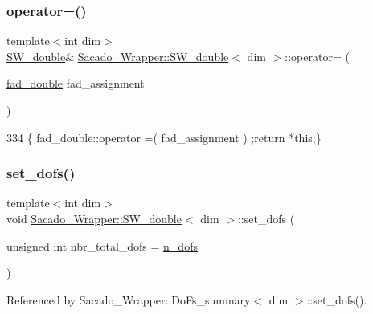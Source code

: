 \subsubsection{\texorpdfstring{operator=()}{operator=()}\hspace{0.1cm}{\footnotesize\ttfamily [2/2]}}
{\footnotesize\ttfamily template$<$int dim$>$ \\
\hyperlink{classSacado__Wrapper_1_1SW__double}{S\+W\+\_\+double}\& \hyperlink{classSacado__Wrapper_1_1SW__double}{Sacado\+\_\+\+Wrapper\+::\+S\+W\+\_\+double}$<$ dim $>$\+::operator= (\begin{DoxyParamCaption}\item[{\hyperlink{Sacado__example_8cc_a868b94676739e612d9c95940e70892a9}{fad\+\_\+double}}]{fad\+\_\+assignment }\end{DoxyParamCaption})\hspace{0.3cm}{\ttfamily [inline]}}


\begin{DoxyCode}
334 \{ fad\_double::operator =( fad\_assignment ) ;\textcolor{keywordflow}{return} *\textcolor{keyword}{this};\}
\end{DoxyCode}
\mbox{\label{classSacado__Wrapper_1_1SW__double_a36ced4218d40104fd8e548039a97cfb8}} 
\subsubsection{\texorpdfstring{set\+\_\+dofs()}{set\_dofs()}}
{\footnotesize\ttfamily template$<$int dim$>$ \\
void \hyperlink{classSacado__Wrapper_1_1SW__double}{Sacado\+\_\+\+Wrapper\+::\+S\+W\+\_\+double}$<$ dim $>$\+::set\+\_\+dofs (\begin{DoxyParamCaption}\item[{unsigned int}]{nbr\+\_\+total\+\_\+dofs = {\ttfamily \hyperlink{classSacado__Wrapper_1_1SW__double_a45e46904e5fd5be42bb4c9bb7454ffc5}{n\+\_\+dofs}} }\end{DoxyParamCaption})}



Referenced by Sacado\+\_\+\+Wrapper\+::\+Do\+Fs\+\_\+summary$<$ dim $>$\+::set\+\_\+dofs().


